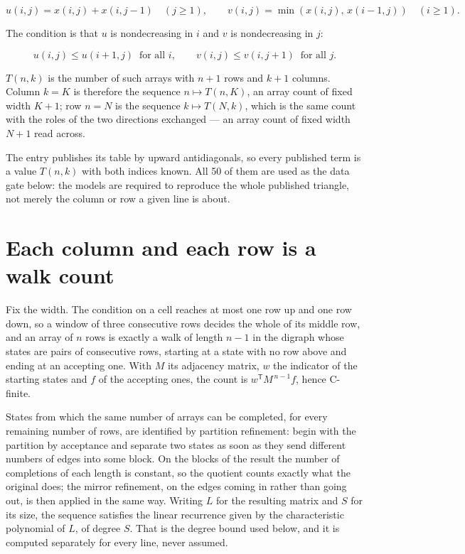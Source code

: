 \documentclass[11pt]{article}
\theoremstyle{definition}
\begin{document}
\[u(i,j) = x(i,j) + x(i,j{-}1)\quad (j \ge 1), \qquad v(i,j) = \min(x(i,j),\,x(i{-}1,j))\quad (i \ge 1).\]

The condition is that $u$ is nondecreasing in $i$ and $v$ is nondecreasing in $j$:

\[u(i,j) \le u(i{+}1,j) \ \text{ for all } i, \qquad v(i,j) \le v(i,j{+}1) \ \text{ for all } j.\]

$T(n,k)$ is the number of such arrays with $n + 1$ rows and $k + 1$ columns. Column $k = K$ is therefore the sequence $n \mapsto T(n,K)$, an array count of fixed width $K + 1$; row $n = N$ is the sequence $k \mapsto T(N,k)$, which is the same count with the roles of the two directions exchanged --- an array count of fixed width $N + 1$ read across.

The entry publishes its table by upward antidiagonals, so every published term is a value $T(n,k)$ with both indices known. All 50 of them are used as the data gate below: the models are required to reproduce the whole published triangle, not merely the column or row a given line is about.

\section{Each column and each row is a walk count}

Fix the width. The condition on a cell reaches at most one row up and one row down, so a window of three consecutive rows decides the whole of its middle row, and an array of $n$ rows is exactly a walk of length $n-1$ in the digraph whose states are pairs of consecutive rows, starting at a state with no row above and ending at an accepting one. With $M$ its adjacency matrix, $w$ the indicator of the starting states and $f$ of the accepting ones, the count is $w^{\mathsf T}M^{\,n-1}f$, hence C-finite.

States from which the same number of arrays can be completed, for every remaining number of rows, are identified by partition refinement: begin with the partition by acceptance and separate two states as soon as they send different numbers of edges into some block. On the blocks of the result the number of completions of each length is constant, so the quotient counts exactly what the original does; the mirror refinement, on the edges coming in rather than going out, is then applied in the same way. Writing $L$ for the resulting matrix and $S$ for its size, the sequence satisfies the linear recurrence given by the characteristic polynomial of $L$, of degree $S$. That is the degree bound used below, and it is computed separately for every line, never assumed.
\end{document}
